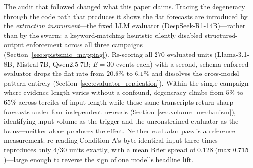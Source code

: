 \documentclass[11pt,journal,onecolumn]{IEEEtran}
\begin{document}
The audit that followed changed what this paper claims. Tracing the degeneracy through the code path that produces it shows the flat forecasts are introduced by the \emph{extraction instrument}---the fixed LLM evaluator (DeepSeek-R1-14B)---rather than by the swarm: a keyword-matching heuristic silently disabled structured-output enforcement across all three campaigns (Section~\ref{sec:epistemic_mapping}). Re-scoring all $270$ evaluated units (Llama-3.1-8B, Mistral-7B, Qwen2.5-7B; $E=30$ events each) with a second, schema-enforced evaluator drops the flat rate from $20.6\%$ to $6.1\%$ and dissolves the cross-model pattern entirely (Section~\ref{sec:evaluator_replication}). Within the single campaign where evidence length varies without a confound, degeneracy climbs from $5\%$ to $65\%$ across terciles of input length while those same transcripts return sharp forecasts under four independent re-reads (Section~\ref{sec:volume_mechanism}), identifying input volume as the trigger and the unconstrained evaluator as the locus---neither alone produces the effect. Neither evaluator pass is a reference measurement: re-reading Condition A's byte-identical input three times reproduces only $4/30$ units exactly, with a mean Brier spread of $0.128$ (max $0.715$)---large enough to reverse the sign of one model's headline lift.
\end{document}
